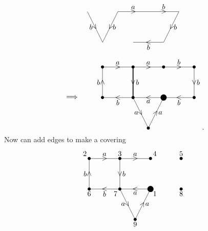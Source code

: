 \begin{example}
$$\begin{tikzpicture}[scale=1.5]
\draw (-1.5, 1) to node{\rotatebox{30}{$ \vee $}} node[left]{$ b $} (-1, 0);
\draw (-0.5, 1) to node{\rotatebox{60}{$ < $}} node[right]{$ b $} (-1, 0);
\draw (-0.5, 1) to node{$ > $} node[above]{$ a $} (0.5, 1);
\draw (0.5, 1) to node{$ > $} node[above]{$ b $} (1.5, 1);
\draw (1.5, 1) to node{\rotatebox{60}{$ < $}} node[right]{$ b $} (1, 0);
\draw (1, 0) to node{$ < $} node[below]{$ b $} (0, 0);
\end{tikzpicture}
$$
$$
\begin{tikzpicture}[scale=1.5]
\draw (-3, 0) node{$ \implies $};
\fill (0, 0) circle (0.1);
\fill (-1, 0) circle (0.05);
\fill (-0.5, -1) circle (0.05);
\fill (-2, 0) circle (0.05);
\fill (-2, 1) circle (0.05);
\fill (-1, 1) circle (0.05);
\fill (0, 1) circle (0.05);
\fill (1, 1) circle (0.05);
\fill (1, 0) circle (0.05);
\draw (0, 0) to node{$ < $} node[below]{$ a $} (-1, 0);
\draw (-1, 0) to node{\rotatebox{30}{$ \vee $}} node[left]{$ a $} (-0.5, -1);
\draw (-0.5, -1) to node{\rotatebox{60}{$ > $}} node[right]{$ a $} (0, 0);
\draw (-1, 0) to node{$ < $} node[below]{$ b $} (-2, 0);
\draw (-2, 0) to node{$ \wedge $} node[left]{$ b $} (-2, 1);
\draw (-2, 1) to node{$ > $} node[above]{$ a $} (-1, 1);
\draw [very thick] (-1, 1) to node{$ \vee $} node[right]{$ b $} (-1, 0);
\draw (-1, 1) to node{$ > $} node[above]{$ a $} (0, 1);
\draw (0, 1) to node{$ > $} node[above]{$ b $} (1, 1);
\draw (1, 1) to node{$ \vee $} node[right]{$ b $} (1, 0);
\draw (1, 0) to node{$ < $} node[below]{$ b $} (0, 0);
\end{tikzpicture}.
$$
Now can add edges to make a covering
$$
\begin{tikzpicture}[scale=1.5]
\fill (0, 0) circle (0.1) node[below right]{$ 1 $};
\fill (-1, 0) circle (0.05) node[below left]{$ 7 $};
\fill (-0.5, -1) circle (0.05) node[below]{$ 9 $};
\fill (-2, 0) circle (0.05) node[below]{$ 6 $};
\fill (-2, 1) circle (0.05) node[above left]{$ 2 $};
\fill (-1, 1) circle (0.05) node[above]{$ 3 $};
\fill (0, 1) circle (0.05) node[above right]{$ 4 $};
\fill (1, 1) circle (0.05) node[above]{$ 5 $};
\fill (1, 0) circle (0.05) node[below]{$ 8 $};
\draw (0, 0) to node{$ < $} node[below]{$ a $} (-1, 0);
\draw (-1, 0) to node{\rotatebox{30}{$ \vee $}} node[left]{$ a $} (-0.5, -1);
\draw (-0.5, -1) to node{\rotatebox{60}{$ > $}} node[right]{$ a $} (0, 0);
\draw (-1, 0) to node{$ < $} node[below]{$ b $} (-2, 0);
\draw (-2, 0) to node{$ \wedge $} node[left]{$ b $} (-2, 1);
\draw (-2, 1) to node{$ > $} node[above]{$ a $} (-1, 1);
\draw (-1, 1) to node{$ \vee $} node[right]{$ b $} (-1, 0);
\draw (-1, 1) to node{$ > $} node[above]{$ a $} (0, 1);

\end{tikzpicture}$$
\end{example}
